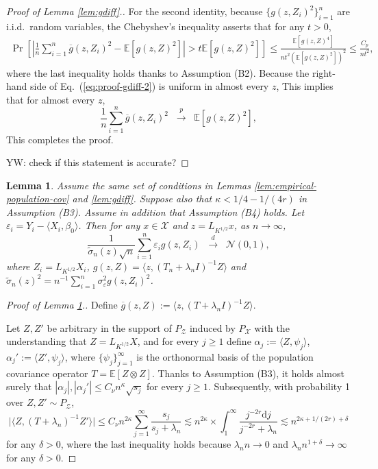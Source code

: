 \documentclass[aos]{imsart}
\renewcommand{\tilde}{\widetilde}
\renewcommand{\bar}{\overline}
\newcommand{\mX}{\mathcal X}
\newcommand{\ud}{\mathrm d}
\theoremstyle{plain}
\newtheorem{lemma}{Lemma}[section]
\theoremstyle{definition}
\theoremstyle{definition}
\begin{document}
\begin{appendix}
\begin{proof}[Proof of Lemma \ref{lem:gdiff}.]
For the second identity, because $\{g(z,Z_i)^2\}_{i=1}^n$ are i.i.d.~random variables,
the Chebyshev's inequality asserts that for any $t>0$, 
\begin{align}
\Pr\left[\left|\frac{1}{n}\sum_{i=1}^n \bar g(z,Z_i)^2 - \mathbb E[g(z,Z)^2]\right| > t\mathbb E[g(z,Z)^2]\right] \leq \frac{\mathbb E[g(z,Z)^4]}{nt^2(\mathbb E[g(z,Z)^2])^2} \leq \frac{C_p}{nt^2},
\label{eq:proof-gdiff-2}
\end{align}
where the last inequality holds thanks to Assumption (B2). 
{\color{magenta}
Because the right-hand side of Eq.~(\ref{eq:proof-gdiff-2}) is uniform in almost every $z$,
This implies that for almost every $z$,
\begin{equation*}
\frac{1}{n}\sum_{i=1}^n\bar g(z,Z_i)^2 \;\;\overset{p}{\to}\;\; \mathbb E[g(z,Z)^2],
\end{equation*} 
This completes the proof. 
}

{\color{magenta} YW: check if this statement is accurate?}
\end{proof}

\begin{lemma}
Assume the same set of conditions in Lemmas \ref{lem:empirical-population-cov} and \ref{lem:gdiff}. 
{\color{cyan}Suppose also that $\kappa < 1/4-1/(4r)$ in Assumption (B3).}
Assume in addition that Assumption (B4) holds.
Let $\varepsilon_i = Y_i - \langle X_i,\beta_0\rangle$. 
Then for any $x\in\mX$ and $z=L_{K^{1/2}}x$, as $n\to\infty$, 
$$
\frac{1}{\tilde\sigma_n(z)\sqrt{n}}\sum_{i=1}^n \varepsilon_i g(z,Z_i)\;\;\overset{d}{\to}\;\; \mathcal N(0,1),
$$
where $Z_i=L_{K^{1/2}}X_i$, $g(z,Z)=\langle z,(T_n+\lambda_n I)^{-1}Z\rangle$ and $\tilde\sigma_n(z)^2 = n^{-1}\sum_{i=1}^n \sigma_\varepsilon^2g(z,Z_i)^2$.
\label{lem:isoclt}
\end{lemma}

\begin{proof}[Proof of Lemma \ref{lem:isoclt}.]
Define $\bar g(z,Z) := \langle z,(T+\lambda_n I)^{-1}Z\rangle$.
{\color{cyan}
Let $Z,Z'$ be arbitrary in the support of $P_{\mathcal Z}$ induced by $P_{\mathcal X}$ with the understanding that $Z=L_{K^{1/2}}X$,
and for every $j\geq 1$ define $\alpha_j := \langle Z,\psi_j\rangle$, $\alpha_j':=\langle Z',\psi_j\rangle$,
where $\{\psi_j\}_{j=1}^{\infty}$ is the orthonormal basis of the population covariance operator $T=\mathbb E[Z\otimes Z]$.
Thanks to Assumption (B3), it holds almost surely that $|\alpha_j|,|\alpha_j'|\leq C_\nu n^{\kappa}\sqrt{s_j}$ for every $j\geq 1$.
Subsequently, with probability 1 over $Z,Z'\sim P_{\mathcal Z}$, 
$$
\big|\langle Z,(T+\lambda_n)^{-1}Z'\rangle\big| \leq C_\nu n^{2\kappa}\sum_{j=1}^{\infty} \frac{s_j}{s_j+\lambda_n}\lesssim n^{2\kappa}\times \int_1^{\infty}\frac{ j^{-2r}\ud j}{j^{-2r}+\lambda_n} \lesssim n^{2\kappa+1/(2r)+\delta}
$$
for any $\delta>0$, where the last inequality holds because $\lambda_n n\to 0$ and $\lambda_n n^{1+\delta}\to \infty$ for any $\delta>0$.

}
\end{proof}
\end{appendix}
\end{document}
